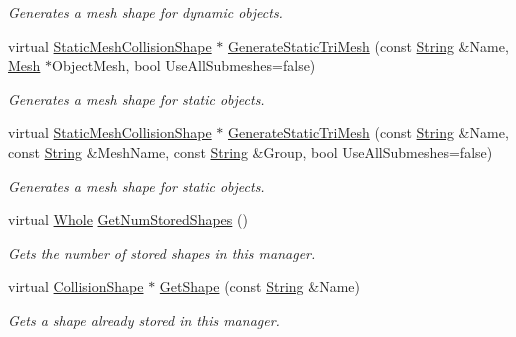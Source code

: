 \begin{DoxyCompactItemize}
\begin{DoxyCompactList}\small\item\em Generates a mesh shape for dynamic objects. \item\end{DoxyCompactList}\item 
virtual \hyperlink{classMezzanine_1_1StaticMeshCollisionShape}{StaticMeshCollisionShape} $\ast$ \hyperlink{classMezzanine_1_1CollisionShapeManager_a46c68d87fec10217b06342f68c15108d}{GenerateStaticTriMesh} (const \hyperlink{namespaceMezzanine_acf9fcc130e6ebf08e3d8491aebcf1c86}{String} \&Name, \hyperlink{classMezzanine_1_1Mesh}{Mesh} $\ast$ObjectMesh, bool UseAllSubmeshes=false)
\begin{DoxyCompactList}\small\item\em Generates a mesh shape for static objects. \item\end{DoxyCompactList}\item 
virtual \hyperlink{classMezzanine_1_1StaticMeshCollisionShape}{StaticMeshCollisionShape} $\ast$ \hyperlink{classMezzanine_1_1CollisionShapeManager_ab4cab76de405e9e10bc8c6a3fddfceea}{GenerateStaticTriMesh} (const \hyperlink{namespaceMezzanine_acf9fcc130e6ebf08e3d8491aebcf1c86}{String} \&Name, const \hyperlink{namespaceMezzanine_acf9fcc130e6ebf08e3d8491aebcf1c86}{String} \&MeshName, const \hyperlink{namespaceMezzanine_acf9fcc130e6ebf08e3d8491aebcf1c86}{String} \&Group, bool UseAllSubmeshes=false)
\begin{DoxyCompactList}\small\item\em Generates a mesh shape for static objects. \item\end{DoxyCompactList}\item 
virtual \hyperlink{namespaceMezzanine_adcbb6ce6d1eb4379d109e51171e2e493}{Whole} \hyperlink{classMezzanine_1_1CollisionShapeManager_a5245d89946a35da5f8cdada2e8c26edf}{GetNumStoredShapes} ()
\begin{DoxyCompactList}\small\item\em Gets the number of stored shapes in this manager. \item\end{DoxyCompactList}\item 
virtual \hyperlink{classMezzanine_1_1CollisionShape}{CollisionShape} $\ast$ \hyperlink{classMezzanine_1_1CollisionShapeManager_ad7d10124aa0702a95ed700c87b59b2b8}{GetShape} (const \hyperlink{namespaceMezzanine_acf9fcc130e6ebf08e3d8491aebcf1c86}{String} \&Name)
\begin{DoxyCompactList}\small\item\em Gets a shape already stored in this manager. \item\end{DoxyCompactList}\item 

\end{DoxyCompactItemize}
